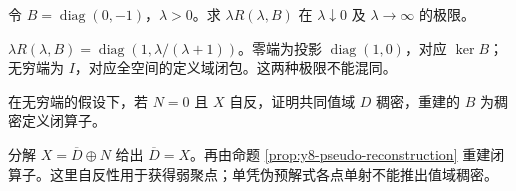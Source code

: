 \begin{exercise}[有限维两端极限]\label{ex:y8-pseudo-diagonal}
令 $B=\operatorname{diag}(0,-1)$，$\lambda>0$。求 $\lambda R(\lambda,B)$ 在 $\lambda\downarrow0$ 及 $\lambda\to\infty$ 的极限。
\end{exercise}
\begin{solution}
$\lambda R(\lambda,B)=\operatorname{diag}(1,\lambda/(\lambda+1))$。零端为投影 $\operatorname{diag}(1,0)$，对应 $\ker B$；无穷端为 $I$，对应全空间的定义域闭包。这两种极限不能混同。
\end{solution}

\begin{exercise}[无穷端与稠密性]\label{ex:y8-pseudo-density}
在无穷端的假设下，若 $N=0$ 且 $X$ 自反，证明共同值域 $D$ 稠密，重建的 $B$ 为稠密定义闭算子。
\end{exercise}
\begin{solution}
分解 $X=\overline D\oplus N$ 给出 $\overline D=X$。再由命题 \ref{prop:y8-pseudo-reconstruction} 重建闭算子。这里自反性用于获得弱聚点；单凭伪预解式各点单射不能推出值域稠密。
\end{solution}
